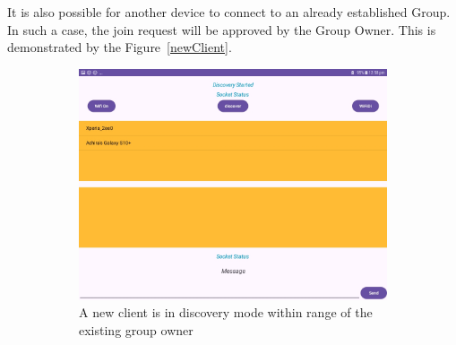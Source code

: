It is also possible for another device to connect to an already established
Group. In such a case, the join request will be approved by the Group Owner.
This is demonstrated by the Figure~\ref{newClient}.

\begin{figure}
    \centering
    \begin{subfigure}[b]{0.6\textwidth}
        \includegraphics[width=\textwidth,
            height=0.4\textheight]{imgs/discovery-newclient.jpg}
        \caption{A new client is in discovery mode within range of the existing
            group owner}
        \label{newClient:discover}
    \end{subfigure}
    \hspace{1cm}
    \begin{subfigure}[b]{0.3\textwidth}

\end{subfigure}
\end{figure}
